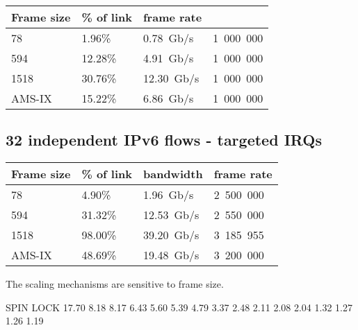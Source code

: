 \begin{tabular}{ | l | l | l | l | }
\hline
Frame size & \% of link & frame rate \\
\hline
78     &  1.96\% &  0.78~Gb/s & 1~000~000 \\ %
594    & 12.28\% &  4.91~Gb/s & 1~000~000 \\ %
1518   & 30.76\% & 12.30~Gb/s & 1~000~000 \\ %
AMS-IX & 15.22\% &  6.86~Gb/s & 1~000~000 \\ %
\hline
\end{tabular}


\subsection{32 independent IPv6 flows - targeted IRQs}
\begin{tabular}{ | l | l | l | l | }
\hline
Frame size & \% of link & bandwidth & frame rate \\
\hline
78     &  4.90\% &  1.96~Gb/s & 2~500~000 \\ %
594    & 31.32\% & 12.53~Gb/s & 2~550~000 \\ %
1518   & 98.00\% & 39.20~Gb/s & 3~185~955 \\ %
AMS-IX & 48.69\% & 19.48~Gb/s & 3~200~000 \\ %
\hline
\end{tabular}
The scaling mechanisms are sensitive to frame size.


SPIN LOCK
  17.70%
   8.18%
   8.17%
   6.43%
   5.60%
   5.39%
   4.79%
   3.37%
   2.48%
   2.11%
   2.08%
   2.04%
   1.32%
   1.27%
   1.26%
   1.19%







